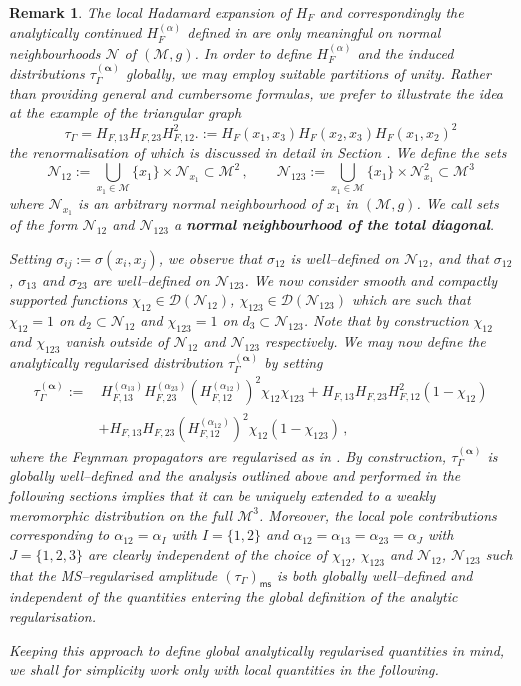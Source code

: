 \documentclass[10pt]{book}
\newcommand{\ms}{\mathsf{ms}}
\newcommand{\Dcal}{\mathcal{D}}
\newcommand{\Mcal}{\mathcal{M}}
\newcommand{\Ncal}{\mathcal{N}}
\theoremstyle{break}
\newtheorem{remark}{Remark}
\begin{document}
\begin{remark}
The local Hadamard expansion  %
of $H_F$ and correspondingly the analytically continued $H^{(\alpha)}_F$ defined in %
are only meaningful on normal neighbourhoods $\Ncal$ of $(\Mcal,g)$. In order to define $H^{(\alpha)}_F$ and the induced distributions $\tau^{(\boldsymbol{\alpha})}_\Gamma$ %
globally, we may employ suitable partitions of unity. Rather than providing general and cumbersome formulas, we prefer to illustrate the idea at the example of the triangular graph
%
$$\tau_\Gamma=H_{F,13}H_{F,23}H_{F,12}^2.:=H_{F}(x_1,x_3)H_{F}(x_2,x_3)H_{F}(x_1,x_2)^2$$
%
the renormalisation of which is discussed in detail in Section %
. We define the sets 
%
$$\Ncal_{12}:=\bigcup_{x_1\in\Mcal}\{x_1\}\times \Ncal_{x_1}\subset \Mcal^2\,,\qquad \Ncal_{123}:=\bigcup_{x_1\in\Mcal}\{x_1\}\times \Ncal_{x_1}^2\subset \Mcal^3$$
%
where $\Ncal_{x_1}$ is an arbitrary normal neighbourhood of $x_1$ in $(\Mcal,g)$. We call sets of the form $\Ncal_{12}$ and $\Ncal_{123}$ a {\bf normal neighbourhood of the total diagonal}.

Setting $\sigma_{ij}:=\sigma(x_i,x_j)$, we observe that $\sigma_{12}$ is well--defined on $\Ncal_{12}$, and that $\sigma_{12}$ , $\sigma_{13}$ and $\sigma_{23}$ are well--defined on $\Ncal_{123}$. We now consider smooth and compactly supported functions $\chi_{12}\in\Dcal(\Ncal_{12})$, $\chi_{123}\in\Dcal(\Ncal_{123})$ which are such that $\chi_{12}=1$ on $d_2\subset \Ncal_{12}$ and $\chi_{123}=1$ on $d_3\subset \Ncal_{123}$. Note that by construction $\chi_{12}$ and $\chi_{123}$ vanish outside of $\Ncal_{12}$ and $\Ncal_{123}$ respectively. We may now define the analytically regularised distribution $\tau^{(\boldsymbol{\alpha})}_\Gamma$ by setting
%
\begin{align*}\tau^{(\boldsymbol{\alpha})}_\Gamma:=&\,H^{(\alpha_{13})}_{F,13}H^{(\alpha_{23})}_{F,23}\left(H^{(\alpha_{12})}_{F,12}\right)^2\chi_{12}\chi_{123} + H_{F,13}H_{F,23}H_{F,12}^2(1-\chi_{12})\\&+H_{F,13}H_{F,23}\left(H^{(\alpha_{12})}_{F,12}\right)^2\chi_{12}(1-\chi_{123})\,,
\end{align*}
%
where the Feynman propagators are regularised as in %
. By construction, $\tau^{(\boldsymbol{\alpha})}_\Gamma$ is globally well--defined and the analysis outlined above and performed in the following sections implies that it can be uniquely extended to a weakly meromorphic distribution on the full $\Mcal^3$. Moreover, the local pole contributions corresponding to $\alpha_{12}=\alpha_I$ with $I=\{1,2\}$ and $\alpha_{12}=\alpha_{13}=\alpha_{23}=\alpha_J$ with $J=\{1,2,3\}$ are clearly independent of the choice of $\chi_{12}$, $\chi_{123}$ and $\Ncal_{12}$, $\Ncal_{123}$ such that the MS--regularised amplitude $(\tau_\Gamma)_\ms$ is both globally well--defined and independent of the quantities entering the global definition of the analytic regularisation.

Keeping this approach to define global analytically regularised quantities in mind, we shall for simplicity work only with local quantities in the following.
\end{remark}
\end{document}
